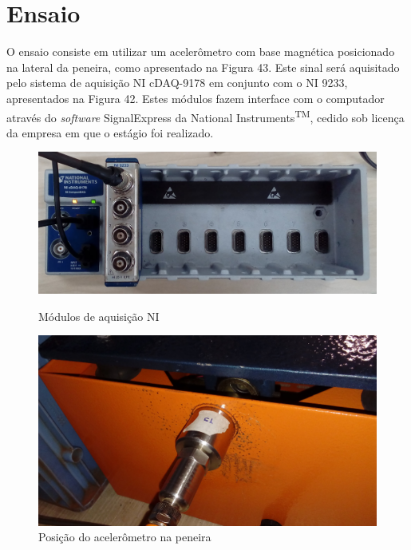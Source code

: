 \documentclass[
	12pt,				%
	openright,			%
	twoside,			%
	a4paper,			%
	english,			%
	french,				%
	spanish,			%
	brazil,				%
	]{abntex2}
\begin{document}
		\newpage

	\section{Ensaio}
		O ensaio consiste em utilizar um acelerômetro com base magnética
		posicionado na lateral da peneira, como apresentado na Figura
		43. Este sinal será aquisitado pelo sistema de aquisição NI
		cDAQ-9178 em conjunto com o NI 9233, apresentados na Figura 42.
		Estes módulos fazem interface com o computador através do
		\textit{software} SignalExpress da National
		Instruments\textsuperscript{TM}, cedido sob licença da empresa
		em que o estágio foi realizado.

		\begin{figure}[!ht]
			\centering
			\begin{minipage}{0.4\linewidth}
				\centering
				\includegraphics[width = \linewidth]{../Fotos/cdaq.jpg}
				\caption{Módulos de aquisição NI}
			\end{minipage}
			\hfill\vline\hfill
			\begin{minipage}{0.4\linewidth}
				\centering
				\includegraphics[width = \linewidth]{../Fotos/peneiraLateralZoom.jpg}
				\caption{Posição do acelerômetro na peneira}
			\end{minipage}
		\end{figure}
\end{document}
